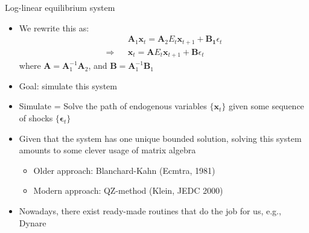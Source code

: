 \documentclass[9pt,xcolor={dvipsnames}]{beamer}
\newcommand{\bit}{\begin{itemize}}
\newcommand{\eit}{\end{itemize}}
\newcommand{\bc}{\color{blue}}
\begin{document}
%
%

\begin{frame}{Log-linear equilibrium system}

\bit
\setlength\itemsep{1.5em}

\item We rewrite this as:
\begin{eqnarray}
&& \mathbf A_1 \mathbf{x}_{t} = \mathbf A_2 E_t \mathbf x_{t+1}  + \mathbf {B_1} \epsilon_t  \nonumber \\
\Rightarrow && \mathbf{x}_{t} = \mathbf A E_t \mathbf x_{t+1}  + \mathbf {B} \epsilon_t \nonumber
\end{eqnarray}
where $\mathbf A = \mathbf A_1^{-1} \mathbf A_2$,  and $\mathbf B = \mathbf A_1^{-1} \mathbf B_1$ 

\item Goal: simulate this system

\item Simulate = Solve the path of endogenous variables $\{\mathbf{x}_{t}\}$ given some sequence of shocks $\{\mathbf \epsilon_t\}$

\item Given that the system has one unique bounded solution, solving this system amounts to some clever usage of matrix algebra
\bit
 	\item Older approach: Blanchard-Kahn (Ecmtra, 1981)
 	
 	\item Modern approach: QZ-method (Klein, JEDC 2000)
\eit

\item Nowadays, there exist ready-made routines that do the job for us, e.g., {\bc Dynare}
\eit

\end{frame}
\end{document}

